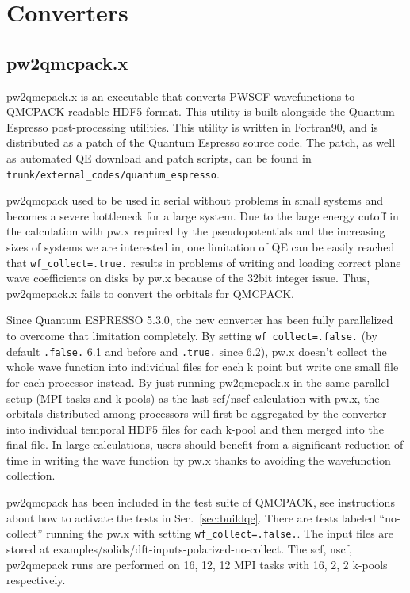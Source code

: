\section{Converters} 
    
  \subsection{pw2qmcpack.x}
\label{sec:pw2qmcpack}
    pw2qmcpack.x is an executable that converts PWSCF wavefunctions to QMCPACK readable 
    HDF5 format.  This utility is built alongside the Quantum Espresso post-processing utilities.
    This utility is written in Fortran90, and is distributed as a patch of the Quantum Espresso 
    source code.  The patch, as well as automated QE download and patch scripts, can be found in 
    \texttt{trunk/external\_codes/quantum\_espresso}.

pw2qmcpack used to be used in serial without problems in small systems and becomes a severe bottleneck for a large system.
Due to the large energy cutoff in the calculation with pw.x required by the pseudopotentials and the increasing sizes of systems we are interested in, one limitation of QE can be easily reached
that \texttt{wf\_collect=.true.} results in problems of writing and loading correct plane wave coefficients on disks by pw.x because of the 32bit integer issue. Thus, pw2qmcpack.x fails to convert the orbitals for QMCPACK.

Since Quantum ESPRESSO 5.3.0, the new converter has been fully parallelized to overcome that limitation completely.
By setting \texttt{wf\_collect=.false.} (by default \texttt{.false.} 6.1 and before and \texttt{.true.} since 6.2), pw.x doesn't collect the whole wave function into individual files for each k point but write one small file for each processor instead.
By just running pw2qmcpack.x in the same parallel setup (MPI tasks and k-pools) as the last scf/nscf calculation with pw.x,
the orbitals distributed among processors will first be aggregated by the converter into individual temporal HDF5 files for each k-pool and then merged into the final file.
In large calculations, users should benefit from a significant reduction of time in writing the wave function by pw.x thanks to avoiding the wavefunction collection.

pw2qmcpack has been included in the test suite of QMCPACK, see instructions about how to activate the tests in Sec.~\ref{sec:buildqe}.
There are tests labeled ``no-collect'' running the pw.x with setting \texttt{wf\_collect=.false.}.
The input files are stored at examples/solids/dft-inputs-polarized-no-collect.
The scf, nscf, pw2qmcpack runs are performed on 16, 12, 12 MPI tasks with 16, 2, 2 k-pools respectively.

